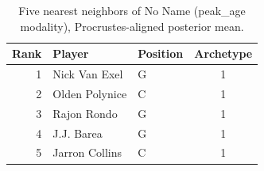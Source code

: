 \begin{table}[htbp]
  \centering\small
  \begin{tabular}{rllc}
    \toprule
    Rank & Player & Position & Archetype \\
    \midrule
    1 & Nick Van Exel & G & 1 \\
    2 & Olden Polynice & C & 1 \\
    3 & Rajon Rondo & G & 1 \\
    4 & J.J. Barea & G & 1 \\
    5 & Jarron Collins & C & 1 \\
    \bottomrule
  \end{tabular}
  \caption{Five nearest neighbors of No Name (peak_age modality), Procrustes-aligned posterior mean.}
  \label{tab:No_Name_neighbors_peak_age}
\end{table}

